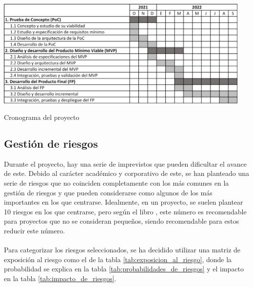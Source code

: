 \documentclass{subfiles}
\begin{document}
\begin{table}[ht]
\centering
\includegraphics[width=0.95\textwidth]{img/planificacion_cronograma.png}
\caption[Cronograma del proyecto]{Cronograma del proyecto}
\label{tab:cronograma_del_proyecto}
\end{table}

        \subsection{Gestión de riesgos}
        \label{sec:gestion_de_riesgos}
        Durante el proyecto, hay una serie de imprevistos que pueden dificultar el avance de este. Debido al carácter académico y corporativo de este, se han planteado una serie de riesgos que no coinciden completamente con los más comunes en la gestión de riesgos y que pueden considerarse como algunos de los más importantes en los que centrarse. Idealmente, en un proyecto, se suelen plantear 10 riesgos en los que centrarse, pero según el libro  \cite{book:hughes_bob_softwareprojectManagement}, este número es recomendable para proyectos que no se consideran pequeños, siendo recomendable para estos reducir este número.

        \paragraph{}
        Para categorizar los riesgos seleccionados, se ha decidido utilizar una matriz de exposición al riesgo como el de la tabla \ref{tab:exposicion_al_riesgo}, donde la probabilidad se explica en la tabla \ref{tab:probabilidades_de_riesgos} y el impacto en la tabla \ref{tab:impacto_de_riesgos}.
\end{document}
